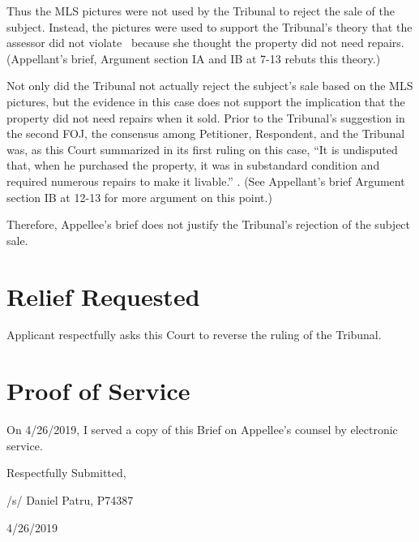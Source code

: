\documentclass[12pt,\documentclassflag]{michiganCourtOfAppealsBrief}
\begin{document}
Thus the MLS pictures were not used by the Tribunal to reject the sale of the subject. Instead, the pictures were used to support the Tribunal's theory that the assessor did not violate \mathieuGast\ because she thought the property did not need repairs. (Appellant's brief, Argument section IA and IB at 7-13 rebuts this theory.)

Not only did the Tribunal not actually reject the subject's sale based on the MLS pictures, but the evidence in this case does not support the implication that the property did not need repairs when it sold. Prior to the Tribunal's suggestion in the second FOJ, the consensus among Petitioner, Respondent, and the Tribunal was, as this Court summarized in its first ruling on this case, ``It is undisputed that, when he purchased the property, it was in substandard condition and required numerous repairs to make it livable.'' . (See Appellant's brief Argument section IB at 12-13 for more argument on this point.)

Therefore, Appellee's brief does not justify the Tribunal's rejection of the subject sale.

\section{Relief Requested}

Applicant respectfully asks this Court to reverse the ruling of the Tribunal. 

\section{Proof of Service}

On 4/26/2019, I served a copy of this Brief on Appellee's counsel by electronic service.

\vspace{1\baselineskip}

{ \setlength{\leftskip}{3.5in}

  Respectfully Submitted,

  /s/ Daniel Patru, P74387

  4/26/2019

  \setlength{\leftskip}{0pt}}

\newpage\empty%
\end{document}
